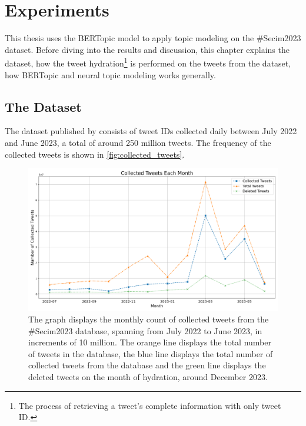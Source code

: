 
\chapter{Experiments}\label{chapter:experiments}

This thesis uses the BERTopic model to apply topic modeling on the \#Secim2023 dataset. 
Before diving into the results and discussion, this chapter explains the dataset, 
how the tweet hydration\footnote{The process of retrieving a tweet's complete information
with only tweet ID.} is performed on the tweets from the dataset, how BERTopic and 
neural topic modeling works generally.

\section{The Dataset}

The dataset published by \textcite{secim2023} consists of tweet IDs collected daily 
between July 2022 and June 2023, a total of around 250 million tweets. 
The frequency of the collected tweets is shown in \autoref{fig:collected_tweets}.

\begin{figure}[htb]
    \centering
    \includegraphics[width=\linewidth]{figures/collected_tweets_2.png}
    \caption[Collected Tweets each month]
    {The graph displays the monthly count of collected tweets from the \#Secim2023 database, 
    spanning from July 2022 to June 2023, in increments of 10 million.
    The orange line displays the total number of tweets in the database, 
    the blue line displays the total number of collected tweets from the database and 
    the green line displays the deleted tweets on the month of hydration, around
    December 2023.}\label{fig:collected_tweets}
\end{figure}

